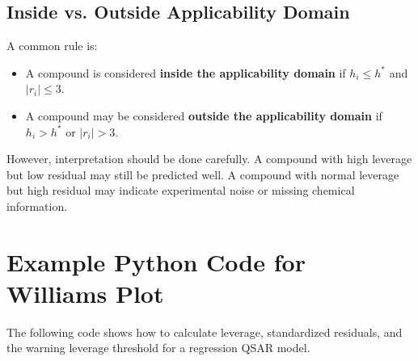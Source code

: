 \documentclass[11pt]{report}
\newenvironment{Important note}{\begin{quote}\color{red}\textbf{Important note:} }{\end{quote}}
\begin{document}
\subsection{Inside vs. Outside Applicability Domain}

A common rule is:

\begin{itemize}[leftmargin=*]
    \item A compound is considered \textbf{inside the applicability domain} if $h_i \leq h^*$ and $|r_i| \leq 3$.
    \item A compound may be considered \textbf{outside the applicability domain} if $h_i > h^*$ or $|r_i| > 3$.
\end{itemize}

However, interpretation should be done carefully. A compound with high leverage but low residual may still be predicted well. A compound with normal leverage but high residual may indicate experimental noise or missing chemical information.

\section{Example Python Code for Williams Plot}

The following code shows how to calculate leverage, standardized residuals, and the warning leverage threshold for a regression QSAR model.
\end{document}
